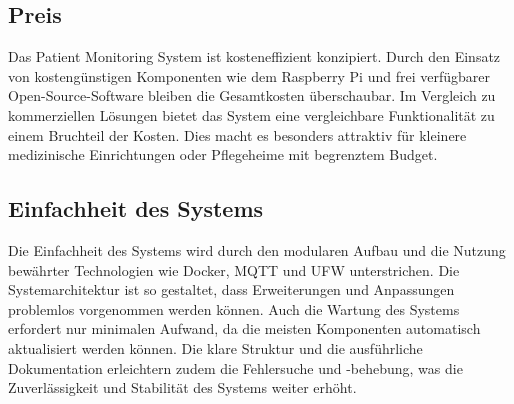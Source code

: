 \subsection{Preis}

Das Patient Monitoring System ist kosteneffizient konzipiert. Durch den Einsatz von kostengünstigen Komponenten wie dem Raspberry Pi und frei verfügbarer Open-Source-Software bleiben die Gesamtkosten überschaubar. Im Vergleich zu kommerziellen Lösungen bietet das System eine vergleichbare Funktionalität zu einem Bruchteil der Kosten. Dies macht es besonders attraktiv für kleinere medizinische Einrichtungen oder Pflegeheime mit begrenztem Budget.

\subsection{Einfachheit des Systems}

Die Einfachheit des Systems wird durch den modularen Aufbau und die Nutzung bewährter Technologien wie Docker, MQTT und UFW unterstrichen. Die Systemarchitektur ist so gestaltet, dass Erweiterungen und Anpassungen problemlos vorgenommen werden können. Auch die Wartung des Systems erfordert nur minimalen Aufwand, da die meisten Komponenten automatisch aktualisiert werden können. Die klare Struktur und die ausführliche Dokumentation erleichtern zudem die Fehlersuche und -behebung, was die Zuverlässigkeit und Stabilität des Systems weiter erhöht.
